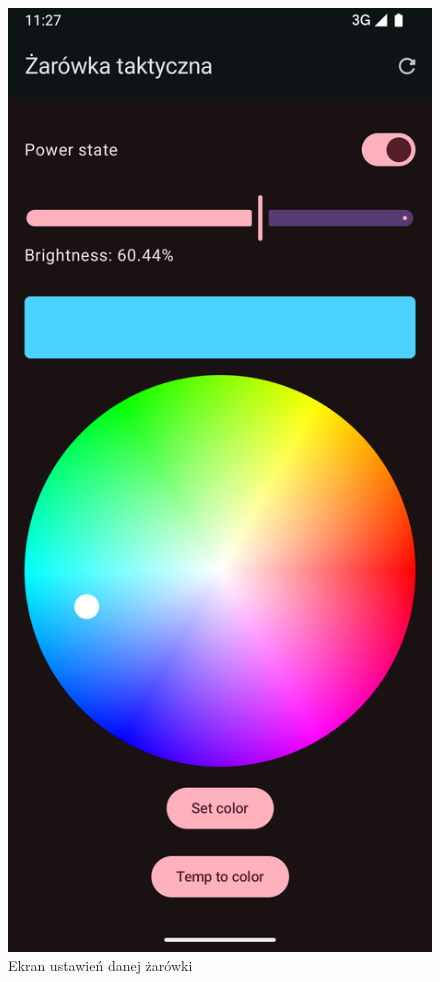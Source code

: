 \documentclass[12pt]{article}
\begin{document}
\begin{figure}[H]
    \centering
    \hypertarget{fig:light-details-screen}{}
    \includegraphics[scale=0.25]{figures/light_detail_screen.png}
    \caption{Ekran ustawień danej żarówki}
    \label{fig:light-details-screen}
\end{figure}
\end{document}
